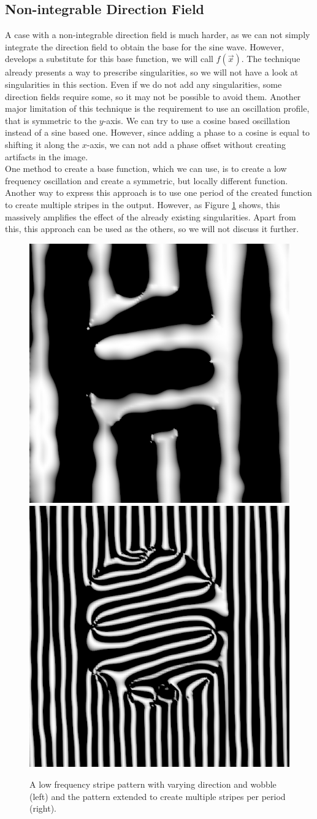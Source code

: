 \documentclass{utue} %
\begin{document}
\subsection{Non-integrable Direction Field}\label{sec:stripes}
A case with a non-integrable direction field is much harder, as we can not simply integrate the direction field to obtain the base for the sine wave. However, \cite{stripes} develops a substitute for this base function, we will call $f(\vec{x})$. The technique already presents a way to prescribe singularities, so we will not have a look at singularities in this section. Even if we do not add any singularities, some direction fields require some, so it may not be possible to avoid them. Another major limitation of this technique is the requirement to use an oscillation profile, that is symmetric to the $y$-axis. We can try to use a cosine based oscillation instead of a sine based one. However, since adding a phase to a cosine is equal to shifting it along the $x$-axis, we can not add a phase offset without creating artifacts in the image.\\
One method to create a base function, which we can use, is to create a low frequency oscillation and create a symmetric, but locally different function. Another way to express this approach is to use one period of the created function to create multiple stripes in the output. However, as Figure \ref{fig:multiStripe} shows, this massively amplifies the effect of the already existing singularities. Apart from this, this approach can be used as the others, so we will not discuss it further.

\begin{figure}[ht]
  \centering
  \includegraphics[width=0.49\linewidth]{images/multiStripe}
  \includegraphics[width=0.49\linewidth]{images/multiStripeMulti}
  \caption{A low frequency stripe pattern with varying direction and wobble (left) and the pattern extended to create multiple stripes per period (right).}\label{fig:multiStripe}
\end{figure}
\end{document}
